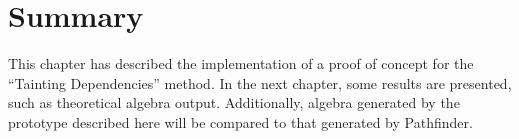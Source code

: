 







\section{Summary}
\label{sect:impl:summary}
This chapter has described the implementation of a proof of concept for the
``Tainting Dependencies'' method. In the next chapter, some results are
presented, such as theoretical algebra output. Additionally, algebra generated
by the prototype described here will be compared to that generated by
Pathfinder.
